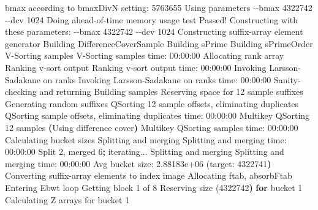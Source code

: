 \documentclass[
  letterpaper,
  DIV=11,
  numbers=noendperiod]{scrartcl}
\newenvironment{Shaded}{\begin{snugshade}}{\end{snugshade}}
\newcommand{\AttributeTok}[1]{\textcolor[rgb]{0.40,0.45,0.13}{#1}}
\newcommand{\ControlFlowTok}[1]{\textcolor[rgb]{0.00,0.23,0.31}{\textbf{#1}}}
\newcommand{\ErrorTok}[1]{\textcolor[rgb]{0.68,0.00,0.00}{#1}}
\newcommand{\ExtensionTok}[1]{\textcolor[rgb]{0.00,0.23,0.31}{#1}}
\newcommand{\KeywordTok}[1]{\textcolor[rgb]{0.00,0.23,0.31}{\textbf{#1}}}
\newcommand{\NormalTok}[1]{\textcolor[rgb]{0.00,0.23,0.31}{#1}}
\begin{document}
\begin{Shaded}
\begin{Highlighting}[]
\ExtensionTok{bmax}\NormalTok{ according to bmaxDivN setting: 5763655}
\ExtensionTok{Using}\NormalTok{ parameters }\AttributeTok{{-}{-}bmax}\NormalTok{ 4322742 }\AttributeTok{{-}{-}dcv}\NormalTok{ 1024}
  \ExtensionTok{Doing}\NormalTok{ ahead{-}of{-}time memory usage test}
  \ExtensionTok{Passed!}\NormalTok{  Constructing with these parameters: }\AttributeTok{{-}{-}bmax}\NormalTok{ 4322742 }\AttributeTok{{-}{-}dcv}\NormalTok{ 1024}
\ExtensionTok{Constructing}\NormalTok{ suffix{-}array element generator}
\ExtensionTok{Building}\NormalTok{ DifferenceCoverSample}
  \ExtensionTok{Building}\NormalTok{ sPrime}
  \ExtensionTok{Building}\NormalTok{ sPrimeOrder}
  \ExtensionTok{V{-}Sorting}\NormalTok{ samples}
  \ExtensionTok{V{-}Sorting}\NormalTok{ samples time: 00:00:00}
  \ExtensionTok{Allocating}\NormalTok{ rank array}
  \ExtensionTok{Ranking}\NormalTok{ v{-}sort output}
  \ExtensionTok{Ranking}\NormalTok{ v{-}sort output time: 00:00:00}
  \ExtensionTok{Invoking}\NormalTok{ Larsson{-}Sadakane on ranks}
  \ExtensionTok{Invoking}\NormalTok{ Larsson{-}Sadakane on ranks time: 00:00:00}
  \ExtensionTok{Sanity{-}checking}\NormalTok{ and returning}
\ExtensionTok{Building}\NormalTok{ samples}
\ExtensionTok{Reserving}\NormalTok{ space for 12 sample suffixes}
\ExtensionTok{Generating}\NormalTok{ random suffixes}
\ExtensionTok{QSorting}\NormalTok{ 12 sample offsets, eliminating duplicates}
\ExtensionTok{QSorting}\NormalTok{ sample offsets, eliminating duplicates time: 00:00:00}
\ExtensionTok{Multikey}\NormalTok{ QSorting 12 samples}
  \KeywordTok{(}\ExtensionTok{Using}\NormalTok{ difference cover}\KeywordTok{)}
  \ExtensionTok{Multikey}\NormalTok{ QSorting samples time: 00:00:00}
\ExtensionTok{Calculating}\NormalTok{ bucket sizes}
\ExtensionTok{Splitting}\NormalTok{ and merging}
  \ExtensionTok{Splitting}\NormalTok{ and merging time: 00:00:00}
\ExtensionTok{Split}\NormalTok{ 2, merged 6}\KeywordTok{;} \ExtensionTok{iterating...}
\ExtensionTok{Splitting}\NormalTok{ and merging}
  \ExtensionTok{Splitting}\NormalTok{ and merging time: 00:00:00}
\ExtensionTok{Avg}\NormalTok{ bucket size: 2.88183e+06 }\ErrorTok{(}\ExtensionTok{target:}\NormalTok{ 4322741}\KeywordTok{)}
\ExtensionTok{Converting}\NormalTok{ suffix{-}array elements to index image}
\ExtensionTok{Allocating}\NormalTok{ ftab, absorbFtab}
\ExtensionTok{Entering}\NormalTok{ Ebwt loop}
\ExtensionTok{Getting}\NormalTok{ block 1 of 8}
  \ExtensionTok{Reserving}\NormalTok{ size }\ErrorTok{(}\ExtensionTok{4322742}\KeywordTok{)} \ControlFlowTok{for}\NormalTok{ bucket }\ExtensionTok{1}
  \ExtensionTok{Calculating}\NormalTok{ Z arrays for bucket 1}

\end{Highlighting}
\end{Shaded}
\end{document}
